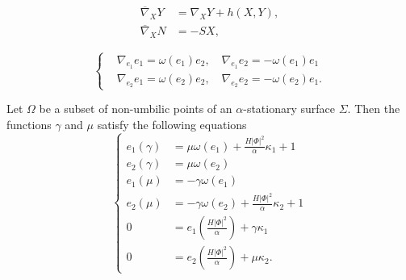 \documentclass[10pt,a4paper]{amsart}
\begin{document}
\begin{equation}\label{gw}  
\begin{split}
    \overline{\nabla}_XY&=\nabla_XY+h(X,Y), \\
    \overline{\nabla}_XN&=-SX,
    \end{split}
\end{equation}

\begin{equation}\label{eiej}
\left\{
\begin{split}
&\nabla_{e_1}e_1=\omega(e_1)e_2,\quad \nabla_{e_1}e_2=-\omega(e_1)e_1\\
&\nabla_{e_2}e_1=\omega(e_2)e_2,\quad \nabla_{e_2}e_2=-\omega(e_2)e_1.
\end{split}\right.
\end{equation}

\begin{lemma}\label{l2}
Let $\Omega$ be a subset of non-umbilic points of an $\alpha$-stationary surface $\Sigma$. Then the functions   $\gamma$ and $\mu$ satisfy the following equations
    \begin{equation}\label{d3}
    \left\{
\begin{split}
            e_{1}(\gamma)&=\mu\omega(e_1)+\frac{H|\Phi|^2}{\alpha}\kappa_1+1\\
            e_{2}(\gamma)&=\mu\omega(e_2)\\
            e_{1}(\mu)&=-\gamma\omega(e_1)\\
            e_{2}(\mu)&=-\gamma\omega(e_2)+\frac{H|\Phi|^2}{\alpha}\kappa_2+1\\
            0&=e_{1}(\frac{H|\Phi|^2}{\alpha})+\gamma\kappa_1\\
            0&=e_{2}(\frac{H|\Phi|^2}{\alpha})+\mu\kappa_2.
        \end{split}\right.
    \end{equation}
\end{lemma}
\end{document}
